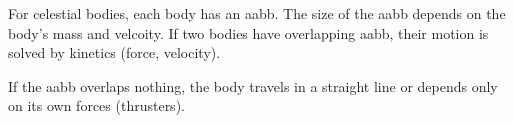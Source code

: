 For celestial bodies, each body has an aabb. The size of the aabb depends on the body's mass and velcoity. If two bodies have overlapping aabb, their motion is solved by kinetics (force, velocity).

If the aabb overlaps nothing, the body travels in a straight line or depends only on its own forces (thrusters). 